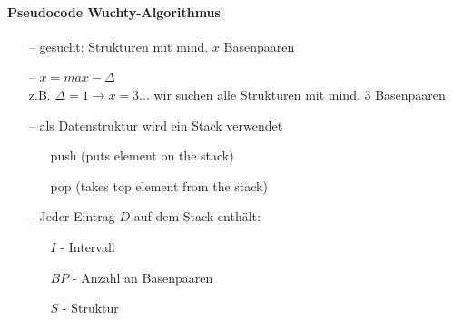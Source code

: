 \paragraph{Pseudocode Wuchty-Algorithmus}
\begin{itemize}
\item[--]gesucht: Strukturen mit mind. $x$ Basenpaaren
\item[--]$x=max-\Delta$ \\ z.B. $\Delta=1 \rightarrow x=3...$ wir suchen alle Strukturen mit mind. 3 Basenpaaren
\item[--]als Datenstruktur wird ein Stack verwendet
	\begin{itemize}
	\item[]push (puts element on the stack)
	\item[]pop (takes top element from the stack)
	\end{itemize}
\item[--]Jeder Eintrag $D$ auf dem Stack enth\"alt:
	\begin{itemize}
	\item[]$I$ - Intervall
	\item[]$BP$ - Anzahl an Basenpaaren
	\item[]$S$ - Struktur
	\end{itemize}
\end{itemize}
